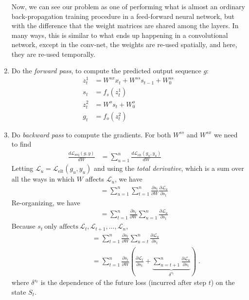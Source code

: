 \begin{enumerate}[(1)]
Now,  we can see our problem as one of performing what is almost an
ordinary back-propagation training procedure in a feed-forward neural
network, but with the difference that the weight matrices are shared
among the layers.  In many ways, this is similar to what ends up
happening in a convolutional network, except in the conv-net, the
weights are re-used spatially, and here, they are re-used temporally.
\item
Do the {\it forward pass}, to compute the predicted output sequence $g$:
\begin{align}
z_t^1 &= W^{sx}x_t + W^{ss}s_{t - 1} + W^{ss}_0\\
s_t &= f_s(z_t^1)\\
z_t^2 &= W^os_t + W_0^o\\
g_t &= f_o(z_t^2)
\end{align}
\item
Do {\em backward pass} to compute the gradients. For both $W^{ss}$ and
$W^{sx}$ we need to find
\begin{align}
\frac{d \mathcal{L}_\text{seq}(g,y)}{d W} &= \sum_{u = 1}^n\frac{d \mathcal{L}_\text{elt}(g_u, y_u)}{d W} ~~~~~~~~~~~~~~~~~~ \nonumber
\end{align}
Letting $\mathcal{L}_u = \mathcal{L}_\text{elt}(g_u, y_u)$ and using the {\em  total derivative}, which is a sum over all
the ways in which $W$ affects $\mathcal{L}_u$, we have
\begin{align}
~~~~ &= \sum_{u = 1}^n\sum_{t = 1}^n  \frac{\partial s_t}{\partial W} \frac{\partial \mathcal{L}_u}{\partial s_t}  \nonumber
\end{align}
Re-organizing, we have
\begin{align}
~~~~ &= \sum_{t = 1}^n\frac{\partial s_t}{\partial W} \sum_{u =
  1}^n\frac{\partial \mathcal{L}_u}{\partial s_t} \nonumber
\end{align}
Because $s_t\ \text{only affects}\ \mathcal{L}_t, \mathcal{L}_{t + 1}, \dots, \mathcal{L}_n$, 
\begin{align}
~~~~~~~~~~~~~~~~~~~~ &= \sum_{t = 1}^n\frac{\partial s_t}{\partial W} \sum_{u = t}^n\frac{\partial \mathcal{L}_u}{\partial s_t} \nonumber\\
&= \sum_{t = 1}^n\frac{\partial s_t}{\partial W} 
  \left(\frac{\partial \mathcal{L}_t}{\partial s_t} + \underbrace{\sum_{u = t +
  1}^n\frac{\partial \mathcal{L}_u}{\partial s_t}}_{\delta^{s_t}}\right) \; .\label{sumeq}
\end{align}
where $\delta^{s_t}$ is the dependence of the future loss (incurred after step $t$) on the
state $S_t$.


\end{enumerate}
